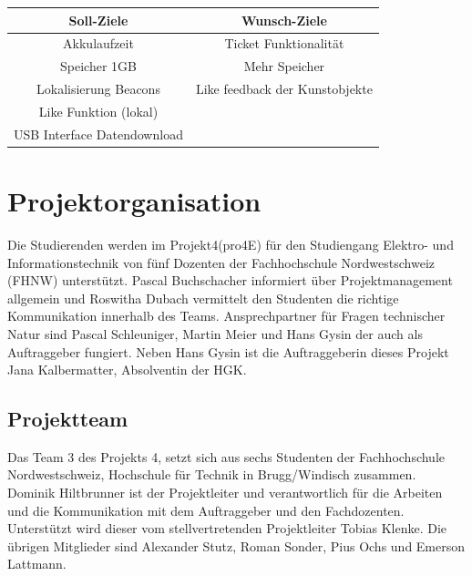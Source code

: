 \documentclass[10pt,a4paper,oneside]{99_fhnwreport}
\begin{document}
\begin{center}

	\begin{tabular}{|c|c|}
		\hline
		 \textbf{Soll-Ziele} &  \textbf{Wunsch-Ziele} \\ \hline
		Akkulaufzeit & Ticket Funktionalität  \\ \hline
		Speicher 1GB & Mehr Speicher \\ \hline
		Lokalisierung Beacons & Like feedback der Kunstobjekte \\ \hline
		Like Funktion (lokal) &\\ \hline
		USB Interface Datendownload &  \\ \hline
		
	\end{tabular}

\end{center}

\section{Projektorganisation}\label{sec:projektorganisation}
Die Studierenden werden im Projekt4(pro4E) für den Studiengang Elektro- und Informationstechnik von fünf Dozenten der Fachhochschule Nordwestschweiz (FHNW) unterstützt. Pascal Buchschacher informiert über Projektmanagement allgemein und Roswitha Dubach vermittelt den Studenten die richtige Kommunikation innerhalb des Teams. Ansprechpartner für Fragen technischer Natur sind Pascal Schleuniger, Martin Meier und Hans Gysin der auch als Auftraggeber fungiert.
Neben Hans Gysin ist die Auftraggeberin dieses Projekt Jana Kalbermatter, Absolventin der HGK.
\subsection{Projektteam}\label{subsec:projektteam}
Das Team 3 des Projekts 4, setzt sich aus sechs Studenten der Fachhochschule Nordwestschweiz, Hochschule für Technik in Brugg/Windisch zusammen. Dominik Hiltbrunner ist der Projektleiter und verantwortlich für die Arbeiten und die Kommunikation mit dem Auftraggeber und den Fachdozenten. Unterstützt wird dieser vom stellvertretenden Projektleiter Tobias Klenke. Die übrigen Mitglieder sind Alexander Stutz, Roman Sonder, Pius Ochs und Emerson Lattmann. 
\end{document}
